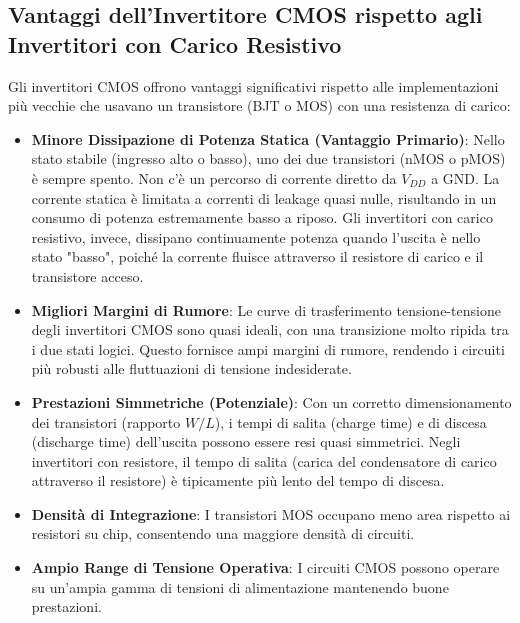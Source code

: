 \subsection{Vantaggi dell'Invertitore CMOS rispetto agli Invertitori con Carico Resistivo}
Gli invertitori CMOS offrono vantaggi significativi rispetto alle implementazioni più vecchie che usavano un transistore (BJT o MOS) con una resistenza di carico:
\begin{itemize}
    \item \textbf{Minore Dissipazione di Potenza Statica (Vantaggio Primario)}: Nello stato stabile (ingresso alto o basso), uno dei due transistori (nMOS o pMOS) è sempre spento. Non c'è un percorso di corrente diretto da $V_{DD}$ a GND. La corrente statica è limitata a correnti di leakage quasi nulle, risultando in un consumo di potenza estremamente basso a riposo. Gli invertitori con carico resistivo, invece, dissipano continuamente potenza quando l'uscita è nello stato "basso", poiché la corrente fluisce attraverso il resistore di carico e il transistore acceso.
    \item \textbf{Migliori Margini di Rumore}: Le curve di trasferimento tensione-tensione degli invertitori CMOS sono quasi ideali, con una transizione molto ripida tra i due stati logici. Questo fornisce ampi margini di rumore, rendendo i circuiti più robusti alle fluttuazioni di tensione indesiderate.
    \item \textbf{Prestazioni Simmetriche (Potenziale)}: Con un corretto dimensionamento dei transistori (rapporto $W/L$), i tempi di salita (charge time) e di discesa (discharge time) dell'uscita possono essere resi quasi simmetrici. Negli invertitori con resistore, il tempo di salita (carica del condensatore di carico attraverso il resistore) è tipicamente più lento del tempo di discesa.
    \item \textbf{Densità di Integrazione}: I transistori MOS occupano meno area rispetto ai resistori su chip, consentendo una maggiore densità di circuiti.
\item \textbf{Ampio Range di Tensione Operativa}: I circuiti CMOS possono operare su un'ampia gamma di tensioni di alimentazione mantenendo buone prestazioni.
\end{itemize}

